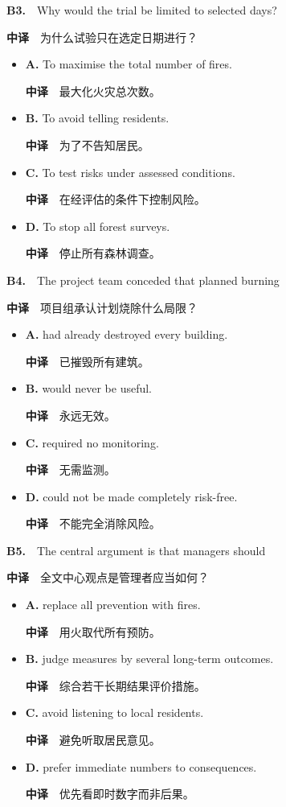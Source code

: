 \documentclass[
  11pt,
]{ctexart}
\begin{document}
\textbf{B3.}　Why would the trial be limited to selected days?

\textbf{中译}　为什么试验只在选定日期进行？

\begin{itemize}
\item
  \textbf{A.} To maximise the total number of fires.

  \textbf{中译}　最大化火灾总次数。
\item
  \textbf{B.} To avoid telling residents.

  \textbf{中译}　为了不告知居民。
\item
  \textbf{C.} To test risks under assessed conditions.

  \textbf{中译}　在经评估的条件下控制风险。
\item
  \textbf{D.} To stop all forest surveys.

  \textbf{中译}　停止所有森林调查。
\end{itemize}

\textbf{B4.}　The project team conceded that planned burning

\textbf{中译}　项目组承认计划烧除什么局限？

\begin{itemize}
\item
  \textbf{A.} had already destroyed every building.

  \textbf{中译}　已摧毁所有建筑。
\item
  \textbf{B.} would never be useful.

  \textbf{中译}　永远无效。
\item
  \textbf{C.} required no monitoring.

  \textbf{中译}　无需监测。
\item
  \textbf{D.} could not be made completely risk-free.

  \textbf{中译}　不能完全消除风险。
\end{itemize}

\textbf{B5.}　The central argument is that managers should

\textbf{中译}　全文中心观点是管理者应当如何？

\begin{itemize}
\item
  \textbf{A.} replace all prevention with fires.

  \textbf{中译}　用火取代所有预防。
\item
  \textbf{B.} judge measures by several long-term outcomes.

  \textbf{中译}　综合若干长期结果评价措施。
\item
  \textbf{C.} avoid listening to local residents.

  \textbf{中译}　避免听取居民意见。
\item
  \textbf{D.} prefer immediate numbers to consequences.

  \textbf{中译}　优先看即时数字而非后果。
\end{itemize}
\end{document}
